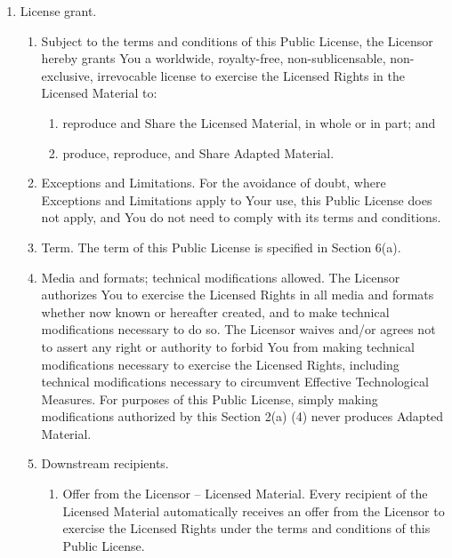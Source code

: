 \begin{enumerate}[label=\alph*.,ref=\alph*]
\item License grant.
  \begin{enumerate}[label=\arabic*.,ref=\arabic*]
  \item Subject to the terms and conditions of this Public License,
    the Licensor hereby grants You a worldwide, royalty-free,
    non-sublicensable, non-exclusive, irrevocable license to exercise
    the Licensed Rights in the Licensed Material to:

    \begin{enumerate}[label=\alph*.,ref=\alph*]
    \item reproduce and Share the Licensed Material, in whole or
      in part; and
    \item produce, reproduce, and Share Adapted Material.
    \end{enumerate}

  \item Exceptions and Limitations. For the avoidance of doubt, where
    Exceptions and Limitations apply to Your use, this Public License
    does not apply, and You do not need to comply with its terms and
    conditions.

  \item Term. The term of this Public License is specified in
    Section 6(a).

  \item Media and formats; technical modifications allowed. The
    Licensor authorizes You to exercise the Licensed Rights in all
    media and formats whether now known or hereafter created, and to
    make technical modifications necessary to do so. The Licensor
    waives and/or agrees not to assert any right or authority to
    forbid You from making technical modifications necessary to
    exercise the Licensed Rights, including technical modifications
    necessary to circumvent Effective Technological Measures. For
    purposes of this Public License, simply making modifications
    authorized by this Section 2(a) (4) never produces Adapted
    Material.

  \item Downstream recipients.
    \begin{enumerate}[label=\alph*.]
    \item Offer from the Licensor -- Licensed Material. Every
      recipient of the Licensed Material automatically
      receives an offer from the Licensor to exercise the
      Licensed Rights under the terms and conditions of this
      Public License.


\end{enumerate}
\end{enumerate}
\end{enumerate}
